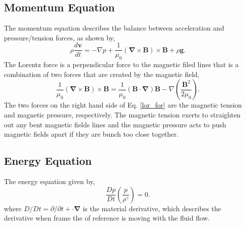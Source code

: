 \documentclass[12pt]{ociamthesis}
\newcommand{\bs}[1]{\boldsymbol{#1}}
\newcommand{\bn}{\boldsymbol{\nabla}}
\newcommand{\eref}[1]{Eq. \eqref{#1}}
\begin{document}
\subsection{Momentum Equation}
\label{section:cont_eq}
The momentum equation describes the balance between acceleration and pressure/tension forces, as shown by,
\begin{equation}\label{eq87}
\rho \frac{d \boldsymbol{v}}{dt} = - \nabla p + \frac{1}{\mu_0} (\bn \times \boldsymbol{B}) \times \boldsymbol{B} + \rho \boldsymbol{g}.
\end{equation}
The Lorentz force is a perpendicular force to the magnetic filed lines that is a combination of two forces that are created by the magnetic field,
\begin{equation}\label{lor_for} 
    \frac{1}{\mu_0}(\bs{\nabla}\times \bs{B})\times \bs{B} = \frac{1}{\mu_0}( \bs{B} \cdot \bs{\nabla}) \bs{B} - \nabla\left(\frac{ \bs{B}^2}{2\mu_0}\right).
\end{equation}
The two forces on the right hand side of \eref{lor_for} are the magnetic tension and magnetic pressure, respectively. The magnetic tension exerts to straighten out any bent magnetic fields lines and the magnetic pressure acts to push magnetic fields apart if they are bunch too close together.    %
\subsection{Energy Equation}
\label{section:cont_eq}
The energy equation given by, 
\begin{equation}\label{eq88}
\frac{D p}{D t} \left( \frac{p}{\rho^{\gamma}} \right) = 0.
\end{equation}
where $D/Dt = \partial/\partial t+\cdot \bn$ is the material derivative, which describes the derivative when frame the of reference is moving with the fluid flow.
\end{document}
